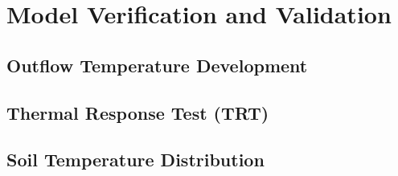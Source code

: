 \chapter{Model Verification and Validation}

\section{Outflow Temperature Development} %

\section{Thermal Response Test (TRT)} %

\section{Soil Temperature Distribution} %



